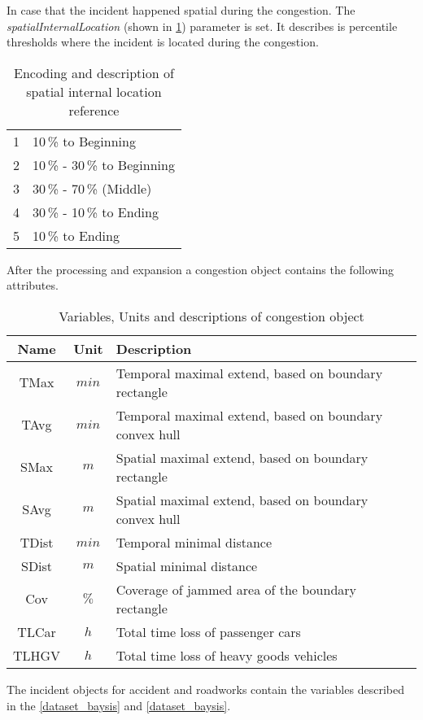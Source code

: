 In case that the incident happened spatial during the congestion. The \textit{spatialInternalLocation} (shown in \cref{tbl:jam_classification_ILS}) parameter is set. It describes is percentile thresholds where the incident is located during the congestion.
\begin{table}[ht!]
	\centering
	\begin{tabular}{c|l}  
		1 & 10\,\% to Beginning \\
 		2 & 10\,\% - 30\,\% to Beginning \\
 		3 & 30\,\% - 70\,\% (Middle) \\
 		4 & 30\,\% - 10\,\% to Ending \\
 		5 & 10\,\% to Ending \\
	\end{tabular}
	\caption{Encoding and description of spatial internal location reference}
	\label{tbl:jam_classification_ILS}
	\vspace{-4mm}
\end{table}
    
After the processing and expansion a congestion object contains the following attributes.
\begin{table}[ht!]
	\centering
	\begin{tabular}{c|c|l} 
		\toprule
		Name & Unit & Description \\
		\midrule 
		TMax  & $min$ & Temporal maximal extend, based on boundary rectangle \\
		TAvg  & $min$ & Temporal maximal extend, based on boundary convex hull \\
		SMax  & $m$   & Spatial maximal extend, based on boundary rectangle \\
		SAvg  & $m$   & Spatial maximal extend, based on boundary convex hull \\
		TDist & $min$ & Temporal minimal distance \\
		SDist & $m$   & Spatial minimal distance \\
		Cov   & $\%$  & Coverage of jammed area of the boundary rectangle \\
		TLCar & $h$   & Total time loss of passenger cars \\
		TLHGV & $h$   & Total time loss of heavy goods vehicles \\
		\bottomrule
	\end{tabular}
	\caption{Variables, Units and descriptions of congestion object}
\end{table}

The incident objects for accident and roadworks contain the variables described in the \cref{dataset_baysis} and \cref{dataset_baysis}.


